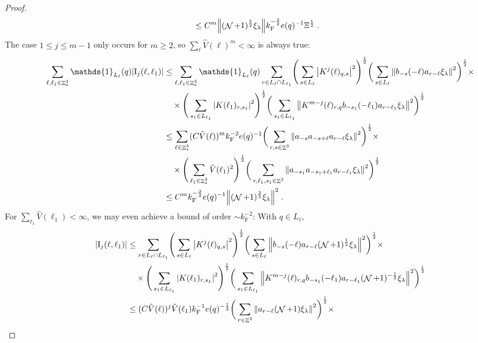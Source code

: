 \documentclass[12pt,a4paper]{article}
\numberwithin{equation}{section}
\newcommand{\1}{\mathbb{I}}
\newcommand{\F}{\mathrm{F}}
\newcommand{\I}{\mathrm{I}}
\DeclareMathOperator{\Z}{\mathbb{Z}}
\DeclareMathOperator{\NN}{\mathcal{N}}
\newcommand{\half}{\frac{1}{2}}
\theoremstyle{plain}
\theoremstyle{definition}
\theoremstyle{remark}
\theoremstyle{plain}
\theoremstyle{definition}
\theoremstyle{remark}
\begin{document}
\begin{proof}
{\begin{align}
 	&\leq C^m \norm{ (\NN+1)^{\frac 52}\xi_\lambda}
 		k_{\F}^{-\frac 32} e(q)^{-1} \Xi^{\half} \;. \label{eq:estEQ2111} 
\end{align}}
The case $ 1 \le j \le m-1 $ only occurs for $ m \ge 2 $, so $ \sum_\ell \hat{V}(\ell)^m < \infty $ is always true:
\textcolor{green!30!black}{
\begin{align}
	\sum_{\ell,\ell_1 \in \Z^3_*} \mathds{1}_{L_\ell}(q) |\I_j(\ell, \ell_1)|
	&\leq \sum_{\ell,\ell_1 \in \Z^3_*} \mathds{1}_{L_\ell}(q) \sum\limits_{r\in L_{\ell} \cap L_{\ell_1}}\! \Bigg( \sum\limits_{s \in L_\ell} \abs{K^{j}(\ell)_{q,s}}^2\Bigg)^\half \bigg( \sum\limits_{s \in L_\ell}\norm{b_{-s}(-\ell) a_{r-\ell} \xi_\lambda}^2\bigg)^\half \times\nonumber\\
		&\quad \times \Bigg( \sum\limits_{s_1 \in L_{\ell_1}}\abs{K(\ell_1)_{r,s_1}}^2\Bigg)^\half \bigg(\sum\limits_{s_1 \in L_{\ell_1}}\norm{ K^{m-j}(\ell)_{r,q} b_{-s_1}(-\ell_1)  a_{r-\ell_1} \xi_\lambda }^2\bigg)^\half
	\nonumber\\
	&\leq \sum_{\ell \in \Z^3_*} (C \hat{V}(\ell))^m
		k_{\F}^{-2} e(q)^{-1}
		\bigg( \sum\limits_{r, s\in \Z^3} \norm{ a_{-s} a_{-s+\ell} a_{r-\ell} \xi_\lambda}^2\bigg)^\half \times \nonumber\\
		&\quad \times 
		\Bigg( \sum_{\ell_1 \in \Z^3_*} \hat{V}(\ell_1)^2 \Bigg)^{\half}
	\bigg(
		\sum\limits_{r, \ell_1, s_1 \in \Z^3} \norm{ a_{-s_1} a_{-s_1 + \ell_1} a_{r-\ell_1} \xi_\lambda }^2\bigg)^\half
	\nonumber\\
	&\leq C^m k_{\F}^{-\frac 32} e(q)^{-1}
	\norm{ (\NN+1)^{\frac 32} \xi_\lambda}^2 \;. \label{eq:estEQ2112_Coulomb}
\end{align}
For $ \sum_{\ell_1} \hat{V}(\ell_1) < \infty $, we may even achieve a bound of order $ \sim k_{\F}^{-2} $: With $ q \in L_\ell $,}
\begin{align}
	|\I_j(\ell, \ell_1)|
	&\leq \sum\limits_{r\in L_{\ell} \cap L_{\ell_1}}\! \Bigg( \sum\limits_{s \in L_\ell} \abs{K^{j}(\ell)_{q,s}}^2\Bigg)^\half \bigg( \sum\limits_{s \in L_\ell}\norm{b_{-s}(-\ell) a_{r-\ell} (\NN+1)^{\half}\xi_\lambda}^2\bigg)^\half \times\nonumber\\
		&\quad \times \Bigg( \sum\limits_{s_1 \in L_{\ell_1}}\abs{K(\ell_1)_{r,s_1}}^2\Bigg)^\half \bigg(\sum\limits_{s_1 \in L_{\ell_1}}\norm{ K^{m-j}(\ell)_{r,q} b_{-s_1}(-\ell_1)  a_{r-\ell_1} (\NN+1)^{-\half}\xi_\lambda }^2\bigg)^\half
	\nonumber\\
	&\leq (C \hat{V}(\ell))^j \hat{V}(\ell_1) k_{\F}^{-1} e(q)^{-\half}
	\bigg( \sum\limits_{r\in \Z^3} \norm{ a_{r-\ell} (\NN+1) \xi_\lambda}^2\bigg)^\half \times \nonumber\\

\end{align}
\end{proof}
\end{document}
